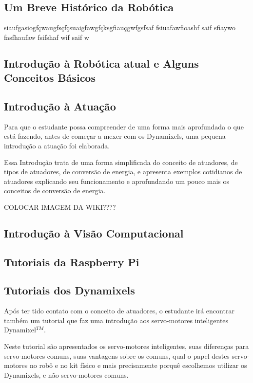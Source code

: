 \subsection{Um Breve Histórico da Robótica}
siaufgasiogfçwaugfsçfçsuaigfawgfçksgfiauçgwfgsfsaf fsiuafawfioashf saif sfiaywo fasfhaufaw fsifshaf wif saif w

\subsection{Introdução à Robótica atual e Alguns Conceitos Básicos}

\subsection{Introdução à Atuação}
Para que o estudante possa compreender de uma forma mais aprofundada o que está fazendo, antes de começar a mexer com os Dynamixels, uma pequena introdução a atuação foi elaborada.

Essa Introdução trata de uma forma simplificada do conceito de atuadores, de tipos de atuadores, de conversão de energia, e apresenta exemplos cotidianos de atuadores explicando seu funcionamento e aprofundando um pouco mais os conceitos de conversão de energia.

COLOCAR IMAGEM DA WIKI???? 

\subsection{Introdução à Visão Computacional}

\subsection{Tutoriais da Raspberry Pi}

\subsection{Tutoriais dos Dynamixels}
Após ter tido contato com o conceito de atuadores, o estudante irá encontrar também um tutorial que faz uma introdução aos servo-motores inteligentes Dynamixel$^{TM}$.

Neste tutorial são apresentados os servo-motores inteligentes, suas diferenças para servo-motores comuns, suas vantagens sobre os comuns, qual o papel destes servo-motores no robô e no kit físico e mais precisamente porquê escolhemos utilizar os Dynamixels, e não servo-motores comuns.

